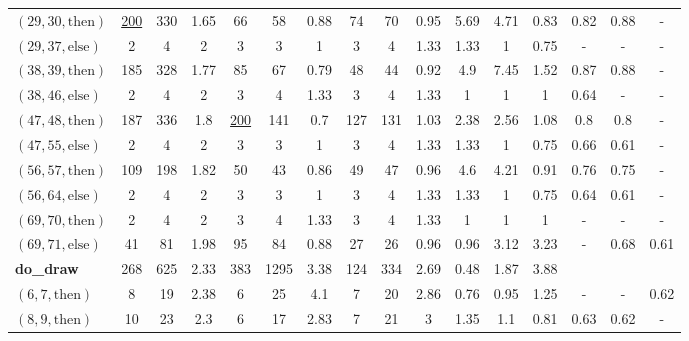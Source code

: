 \documentclass[sigconf,review,anonymous]{acmart}
\newcommand{\thenBr}{\text{then}}
\newcommand{\elseBr}{\text{else}}
\newcommand{\un}[1]{\underline{#1}}
\begin{document}
\begin{table}[!t]
\begin{tabular}{l|ccc|ccc|ccc|ccc|ccc}
    $(29,30,\thenBr)$        & \un{200} & 330  & 1.65      & 66   & 58  & 0.88          & 74  & 70  & 0.95             & 5.69   & 4.71  & 0.83   & 0.82 & 0.88 & -   \\
    $(29,37,\elseBr)$        & 2        & 4    & 2         & 3    & 3   & 1             & 3   & 4   & 1.33             & 1.33   & 1     & 0.75   & - & - & -  \\
    $(38,39,\thenBr)$        & 185      & 328  & 1.77      & 85   & 67  & 0.79          & 48  & 44  & 0.92             & 4.9    & 7.45  & 1.52   & 0.87 & 0.88 & -  \\
    $(38,46,\elseBr)$        & 2        & 4    & 2         & 3    & 4   & 1.33          & 3   & 4   & 1.33             & 1      & 1     & 1      & 0.64 & - & -  \\
    $(47,48,\thenBr)$        & 187      & 336  & 1.8       & \un{200} & 141 & 0.7       & 127 & 131 & 1.03             & 2.38   & 2.56  & 1.08   & 0.8  & 0.8  & -  \\
    $(47,55,\elseBr)$        & 2        & 4    & 2         & 3    & 3   & 1             & 3   & 4   & 1.33             & 1.33   & 1     & 0.75   & 0.66 & 0.61 & -  \\
    $(56,57,\thenBr)$        & 109      & 198  & 1.82      & 50   & 43  & 0.86          & 49  & 47  & 0.96             & 4.6    & 4.21  & 0.91   & 0.76 & 0.75 & -   \\
    $(56,64,\elseBr)$        & 2        & 4    & 2         & 3    & 3   & 1             & 3   & 4   & 1.33             & 1.33   & 1     & 0.75   & 0.64 & 0.61 & -  \\
    $(69,70,\thenBr)$        & 2        & 4    & 2         & 3    & 4   & 1.33          & 3   & 4   & 1.33             & 1      & 1     & 1      & - & - & -  \\
    $(69,71,\elseBr)$        & 41       & 81   & 1.98      & 95   & 84  & 0.88          & 27  & 26  & 0.96             & 0.96   & 3.12  & 3.23   & - & 0.68 & 0.61  \\
    \hline
    \textbf{do\_draw}        & 268      & 625  & 2.33      & 383  & 1295 & 3.38         & 124 & 334 & 2.69             & 0.48   & 1.87  & 3.88   &      &      &       \\
    $(6,7,\thenBr)$          & 8        & 19   & 2.38      & 6    & 25   & 4.1          & 7   & 20  & 2.86             & 0.76   & 0.95  & 1.25   & - & -  &  0.62 \\
    $(8,9,\thenBr)$          & 10       & 23   & 2.3       & 6    & 17   & 2.83         & 7   & 21  & 3                & 1.35   & 1.1   & 0.81   & 0.63 & 0.62 &  - \\

\end{tabular}
\end{table}
\end{document}
